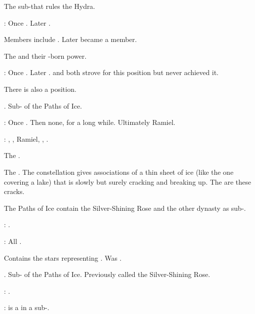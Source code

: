 \begin{gloss}
    The sub-\nexus that rules the Hydra. 
    
    \Apex: 
    Once \Nexagglachel.
    Later \Ishnaruchaefir.

    Members include \Rystessakhin.
    Later \Secherdamon became a member. 
  
    The \dragons{} and their \xs-born power. 
    
    \Apex: 
    Once \TyarithXserasshana. 
    Later \Vizsherioch. 
    \Nexagglachel{} and \Secherdamon{} both strove for this position but never achieved it. 
    
    There is also a  position. 

    . 
    Sub-\nexus{} of the Paths of Ice. 
    
    \Apex: 
    Once \Zachirah. 
    Then none, for a long while. 
    Ultimately Ramiel. 
    
    \CardinalPoints: 
    \Nathrach, \Shiaraid, Ramiel, \Dasteron, \Kishiel. 

    The \caisith{} \nexus{}. 
  
    The \banelords.
    The constellation gives associations of a thin sheet of ice (like the one covering a lake) that is slowly but surely cracking and breaking up. 
    The  are these cracks. 
    
    The Paths of Ice contain the Silver-Shining Rose and the other dynasty \nexuses{} as sub-\nexuses. 
    
    \Apex: 
    \Daggerrain. 
    
    \CardinalPoints: All \banelords. 
  
  \gitemthe{\Malgryph}
    Contains the stars representing . 
    Was . 
  
    \CiriathSepher. 
    Sub-\nexus{} of the Paths of Ice. 
    Previously called the Silver-Shining Rose.
    
    \Apex:
    \Azraid. 
    
    \CardinalPoints: 
    \Teshrial{} is a \cardinalpoint{} in a sub-\nexus.
  

\end{gloss}

